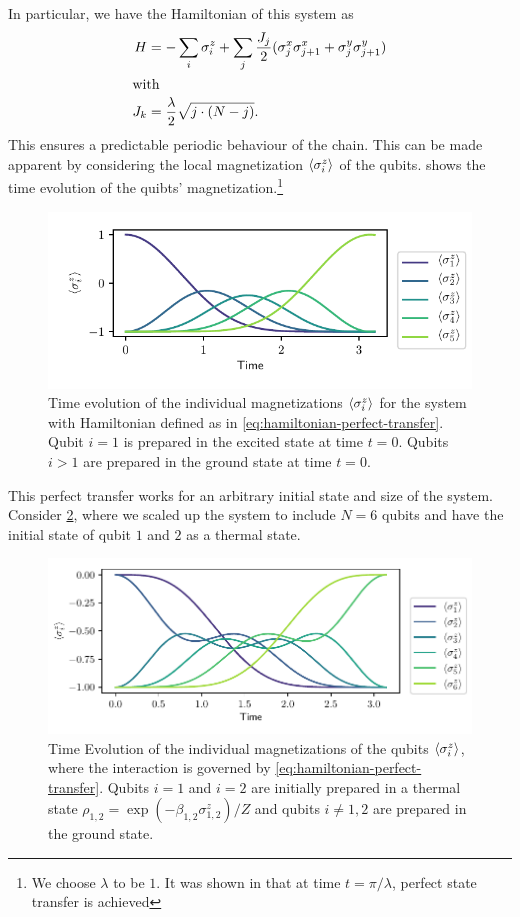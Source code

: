 \documentclass[a4paper,11pt]{scrartcl}
\begin{document}
In particular, we have the Hamiltonian of this system as
\begin{align}\label{eq:hamiltonian-perfect-transfer}
    H &= -\sum\limits_i \sigma^z_i + \sum\limits_j \frac{J_j}{2} (\sigma^x_j\sigma^x_{j+1}+\sigma^y_j\sigma^y_{j+1})\\
    \shortintertext{with}
    J_k &= \frac{\lambda}{2}\sqrt{j\cdot(N-j)}.\nonumber
\end{align}
This ensures a predictable periodic behaviour of the chain. This can be made apparent by considering the local
magnetization $\expval{\sigma^z_i}$ of the qubits.  shows the time evolution of the quibts'
magnetization.\footnote{We choose $\lambda$ to be $1$. It was shown in \cite{BA_Christandl_2004} that at
time $t=\pi/\lambda$, perfect state transfer is achieved}
\begin{figure}[H]
    \centering
    \includegraphics{expval_z.pdf}
    \caption{Time evolution of the individual magnetizations $\expval{\sigma^z_i}$ for the system with
    Hamiltonian defined as in \cref{eq:hamiltonian-perfect-transfer}.
    Qubit $i=1$ is prepared in the excited state at time $t=0$.
    Qubits $i>1$ are prepared in the ground state at time $t=0$.}
    \label{fig:no-corr}
\end{figure}
This perfect transfer works for an arbitrary initial state and size of the system. Consider \cref{fig:no-corr-thermal},
where we scaled up the system to include $N=6$ qubits and have the initial state of qubit $1$ and $2$ as a thermal state.
\begin{figure}
    \centering
    \includegraphics{thermal-state-expval-z-no-corr.pdf}
    \caption{Time Evolution of the individual magnetizations of the qubits
    $\expval{\sigma^z_i}$, where the interaction is governed by \cref{eq:hamiltonian-perfect-transfer}.
    Qubits $i=1$ and $i=2$ are initially prepared in a thermal state $\rho_{1,2} = \exp(-\beta_{1,2}\sigma^z_{1,2})/Z$
    and qubits $i\neq1,2$ are prepared in the ground state.}
    \label{fig:no-corr-thermal}
\end{figure}
\end{document}
